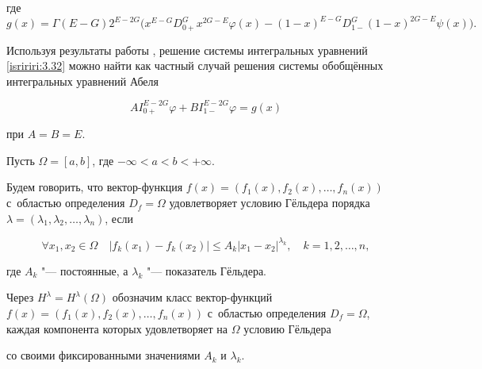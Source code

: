 где $$g(x)=\Gamma(E-G)2^{E-2G}\bigl(x^{E-G}D^{G}_{0+}x^{2G-E}\varphi(x)-(1-x)^{E-G}D^{G}_{1-}(1-x)^{2G-E}\psi(x)\bigr).$$



Используя результаты работы \cite{rayanova:bib:Ismag}, решение системы интегральных уравнений \eqref{isririri:3.32} можно найти как частный случай решения системы обобщённых интегральных уравнений Абеля

$$AI^{E-2G}_{0+}\varphi+BI^{E-2G}_{1-}\varphi=g(x)$$

при $A=B=E$.



\smallskip



Пусть $\Omega=[a,b]$, где $-\infty<a<b<+\infty$. 

Будем говорить, что вектор-функция $f(x)=(f_1(x), f_2(x), \dots, f_n(x))$ с~областью определения $D_f=\Omega$ удовлетворяет условию Гёльдера порядка $\lambda=(\lambda_1,\lambda_2,\dots,\lambda_n)$, если

\begin{equation}\label{isririri:3.34}

\forall x_1, x_2 \in \Omega \quad 

|f_k(x_1)-f_k(x_2)|\leq A_k|x_1-x_2|^{\lambda_k}, \quad k=1, 2, \dots, n ,

\end{equation}

где $A_k$ "--- постоянные, а $\lambda_k$ "--- показатель Гёльдера.



\smallskip



\begin{definition}[1]Через $H^{\lambda}=H^{\lambda}(\Omega)$ обозначим класс вектор-функций $f(x)=(f_1(x),f_2(x),\dots,f_n(x))$ с~областью определения $D_f=\Omega$, каждая компонента которых удовлетворяет на $\Omega$ условию Гёльдера 




со своими фиксированными значениями $A_k$ и $\lambda_k$.

\end{definition}



\smallskip



